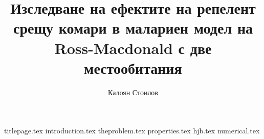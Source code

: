 \documentclass[bulgarian, 12pt]{article}
\title{Изследване на ефектите на репелент срещу комари в малариен модел на Ross-Macdonald с две местообитания}
\author{Калоян Стоилов}
\theoremstyle{definition}
\begin{document}
{titlepage.tex}
\tableofcontents
\thispagestyle{empty}
\newpage
\setcounter{page}{1}
{introduction.tex}
{theproblem.tex}
{properties.tex}
{hjb.tex}
{numerical.tex}
\pagebreak
\printbibliography[heading=bibintoc]
\end{document}
